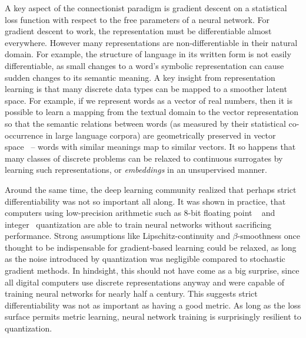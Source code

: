 \documentclass[12pt,initial,twoside,maitrise]{dms}
\numberwithin{equation}{section}
\numberwithin{table}{chapter}
\numberwithin{figure}{chapter}
\begin{document}
A key aspect of the connectionist paradigm is gradient descent on a statistical loss function with respect to the free parameters of a neural network. For gradient descent to work, the representation must be differentiable almost everywhere. However many representations are non-differentiable in their natural domain. For example, the structure of language in its written form is not easily differentiable, as small changes to a word's symbolic representation can cause sudden changes to its semantic meaning. A key insight from representation learning is that many discrete data types can be mapped to a smoother latent space. For example, if we represent words as a vector of real numbers, then it is possible to learn a mapping from the textual domain to the vector representation so that the semantic relations between words (as measured by their statistical co-occurrence in large language corpora) are geometrically preserved in vector space~\cite{pennington2014glove} -- words with similar meanings map to similar vectors. It so happens that many classes of discrete problems can be relaxed to continuous surrogates by learning such representations, or \textit{embeddings} in an unsupervised manner.

Around the same time, the deep learning community realized that perhaps strict differentiability was not so important all along. It was shown in practice, that computers using low-precision arithmetic such as 8-bit floating point ~\cite{wang2018training} and integer~\cite{jacob2018quantization} quantization are able to train neural networks without sacrificing performance. Strong assumptions like Lipschitz-continuity and $\beta$-smoothness once thought to be indispensable for gradient-based learning could be relaxed, as long as the noise introduced by quantization was negligible compared to stochastic gradient methods. In hindsight, this should not have come as a big surprise, since all digital computers use discrete representations anyway and were capable of training neural networks for nearly half a century. This suggests strict differentiability was not as important as having a good metric. As long as the loss surface permits metric learning, neural network training is surprisingly resilient to quantization.
\end{document}

